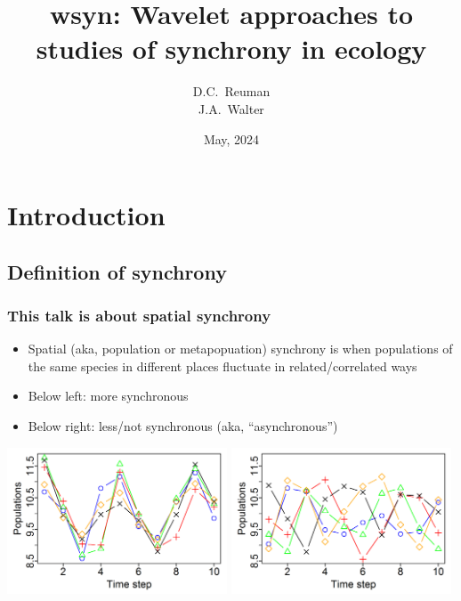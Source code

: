 \documentclass{beamer}
\title[Wavelet approaches to synchrony]
{
wsyn: Wavelet approaches to studies of synchrony in ecology
}
\author[Reuman]
{
D.C.~Reuman\inst{1} \\
J.A.~Walter\inst{2}
}
\institute
{
\inst{1}
University of Kansas \\
\inst{2}
UC Davis and University of Virginia
}
\date[KPT 2003]
{
May, 2024
}
\begin{document}
\begin{frame}
\titlepage
\end{frame}

\section{Introduction}

\subsection{Definition of synchrony}

\begin{frame}
\frametitle{This talk is about spatial synchrony}
\begin{itemize}
\item Spatial (aka, population or metapopuation) synchrony is when populations of the same species in different places fluctuate in related/correlated ways
\item Below left: more synchronous
\item Below right: less/not synchronous (aka, ``asynchronous'')
\end{itemize}
\includegraphics[width= 0.49\textwidth]{figures/Sync.png}
\includegraphics[width= 0.49\textwidth]{figures/Asyn.png}
\end{frame}
\end{document}
